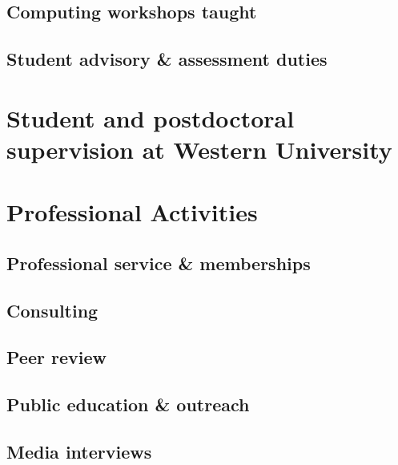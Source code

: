 \documentclass[12pt]{article}
\begin{document}
\subsection{Computing workshops taught} 


\vspace{0.5cm}
\subsection{Student advisory \& assessment duties}


\section{Student and postdoctoral supervision at Western University}




\section{Professional Activities}



\subsection{Professional service \& memberships}


\vspace{0.8cm}
\subsection{Consulting}


\subsection{Peer review}


\subsection{Public education \& outreach}


\vspace{0.8cm}
\subsection{Media interviews}


\clearpage
\end{document}
